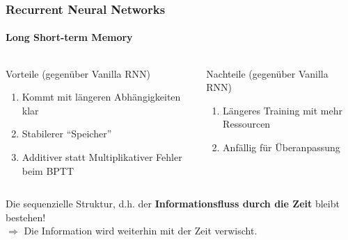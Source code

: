 \documentclass[aspectratio=169]{beamer}
\begin{document}
\begin{frame}
	\frametitle{Recurrent Neural Networks}
	\framesubtitle{Long Short-term Memory}
	\begin{columns}[t]
		\begin{column}{0.5\textwidth}
			\begin{block}{Vorteile (gegenüber Vanilla RNN)}
			\begin{enumerate}[label={\color{mygreen}\textbf{+}}]
				\item Kommt mit längeren Abhängigkeiten klar
				\item Stabilerer ``Speicher''
				\item Additiver statt Multiplikativer Fehler beim BPTT
			\end{enumerate}
			\end{block}
		\end{column}
		\hfill
		\begin{column}{0.5\textwidth}
			\begin{block}{Nachteile (gegenüber Vanilla RNN)}
			\begin{enumerate}[label={\color{myred}\textbf{-}}]
				\item Längeres Training mit mehr Ressourcen
				\item Anfällig für Überanpassung
			\end{enumerate}
			\end{block}
		\end{column}
	\end{columns}
	\vspace{1.0cm}
	Die sequenzielle Struktur, d.h. der \textbf{Informationsfluss durch die Zeit} bleibt bestehen!\\
	\vspace{0.5cm}
	$\Rightarrow$ Die Information wird weiterhin mit der Zeit verwischt.
\end{frame}
\end{document}
